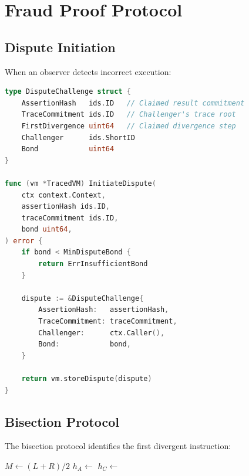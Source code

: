 \documentclass[11pt,a4paper]{article}
\begin{document}
\section{Fraud Proof Protocol}

\subsection{Dispute Initiation}

When an observer detects incorrect execution:

\begin{lstlisting}[language=Go, caption=Fraud proof initiation]
type DisputeChallenge struct {
    AssertionHash   ids.ID   // Claimed result commitment
    TraceCommitment ids.ID   // Challenger's trace root
    FirstDivergence uint64   // Claimed divergence step
    Challenger      ids.ShortID
    Bond            uint64
}

func (vm *TracedVM) InitiateDispute(
    ctx context.Context,
    assertionHash ids.ID,
    traceCommitment ids.ID,
    bond uint64,
) error {
    if bond < MinDisputeBond {
        return ErrInsufficientBond
    }

    dispute := &DisputeChallenge{
        AssertionHash:   assertionHash,
        TraceCommitment: traceCommitment,
        Challenger:      ctx.Caller(),
        Bond:            bond,
    }

    return vm.storeDispute(dispute)
}
\end{lstlisting}

\subsection{Bisection Protocol}

The bisection protocol identifies the first divergent instruction:

\begin{algorithm}
\caption{Bisection Dispute Resolution}
\begin{algorithmic}[1]
        \State \Return {}
    \EndIf
    \State $M \gets (L + R) / 2$
    \State $h_A \gets$ 
    \State $h_C \gets$ 
        \State \Return {}
    \Else
        \State \Return {}
    \EndIf
\EndProcedure
\end{algorithmic}
\end{algorithm}
\end{document}
